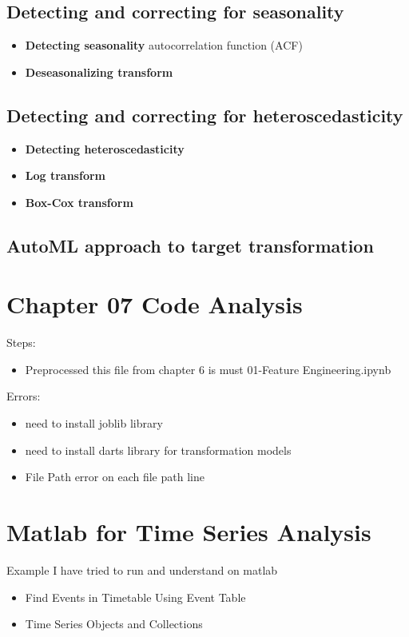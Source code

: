 \documentclass{article}
\begin{document}
\subsection{Detecting and correcting for seasonality}
\begin{itemize}
    \item \textbf{Detecting seasonality} autocorrelation function (ACF)
    \item \textbf{Deseasonalizing transform}
\end{itemize}
\subsection{Detecting and correcting for heteroscedasticity}
\begin{itemize}
    \item \textbf{Detecting heteroscedasticity}
    \item \textbf{Log transform}
    \item \textbf{Box-Cox transform}
\end{itemize}
\subsection{AutoML approach to target transformation}

\section{Chapter 07 Code Analysis}

Steps:
\begin{itemize}
    \item Preprocessed this file from chapter 6 is must 01-Feature Engineering.ipynb
\end{itemize}
Errors:
\begin{itemize}
	\item need to install joblib library
	\item need to install darts library for transformation models
    \item File Path error on each file path line

\end{itemize}

\section{Matlab for Time Series Analysis}
Example I have tried to run and understand on matlab
\begin{itemize}
    \item Find Events in Timetable Using Event Table
    \item Time Series Objects and Collections
\end{itemize}
\end{document}
